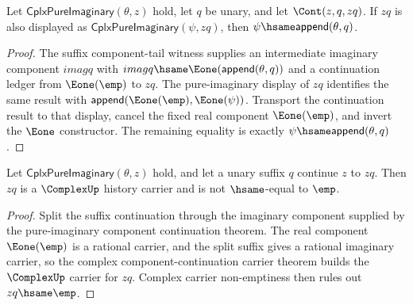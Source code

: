 \begin{theorem}
\label{thm:cplx-pure-imaginary-suffix-parameter-readback}
Let \(\mathsf{CplxPureImaginary}(\theta,z)\) hold, let \(q\) be unary, and let
\(\Cont(z,q,zq)\). If \(zq\) is also displayed as
\(\mathsf{CplxPureImaginary}(\psi,zq)\), then
\(\psi\hsame\mathsf{append}(\theta,q)\).
\end{theorem}
\begin{proof}
The suffix component-tail witness supplies an intermediate imaginary component
\(imagq\) with \(imagq\hsame\Eone(\mathsf{append}(\theta,q))\) and a
continuation ledger from \(\Eone(\emp)\) to \(zq\). The pure-imaginary display
of \(zq\) identifies the same result with
\(\mathsf{append}(\Eone(\emp),\Eone(\psi))\). Transport the continuation result
to that display, cancel the fixed real component \(\Eone(\emp)\), and invert
the \(\Eone\) constructor. The remaining equality is exactly
\(\psi\hsame\mathsf{append}(\theta,q)\).
\end{proof}

\begin{theorem}
\label{thm:cplx-pure-imaginary-suffix-continuation-complex-carrier}
Let \(\mathsf{CplxPureImaginary}(\theta,z)\) hold, and let a unary suffix \(q\)
continue \(z\) to \(zq\). Then \(zq\) is a \(\ComplexUp\) history carrier and
is not \(\hsame\)-equal to \(\emp\).
\end{theorem}
\begin{proof}
Split the suffix continuation through the imaginary component supplied by the
pure-imaginary component continuation theorem. The real component
\(\Eone(\emp)\) is a rational carrier, and the split suffix gives a rational
imaginary carrier, so the complex component-continuation carrier theorem builds
the \(\ComplexUp\) carrier for \(zq\). Complex carrier non-emptiness then rules
out \(zq\hsame\emp\).
\end{proof}

